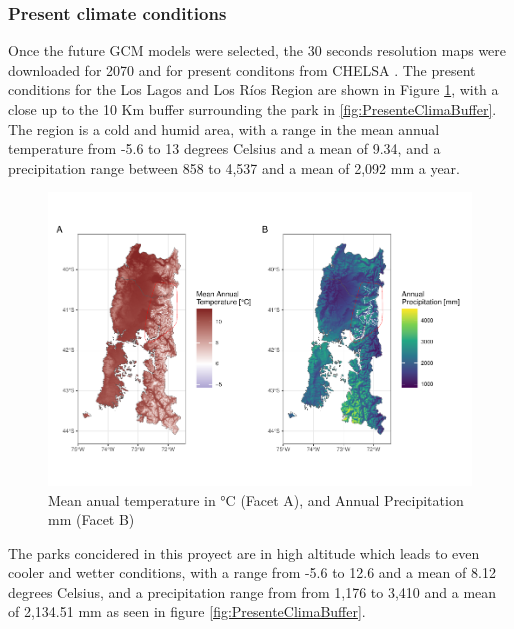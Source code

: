 \documentclass[]{article}
\begin{document}
\hypertarget{present-climate-conditions}{%
\subsubsection{Present climate conditions}\label{present-climate-conditions}}

Once the future GCM models were selected, the 30 seconds resolution maps were downloaded for 2070 and for present conditons from CHELSA \citep{karger2020high}.
The present conditions for the Los Lagos and Los Ríos Region are shown in Figure \ref{fig:PresenteClima}, with a close up to the 10 Km buffer surrounding the park in \ref{fig:PresenteClimaBuffer}. The region is a cold and humid area, with a range in the mean annual temperature from -5.6 to 13 degrees Celsius and a mean of 9.34, and a precipitation range between 858 to 4,537 and a mean of 2,092 mm a year.

\begin{figure}
\includegraphics[width=1\linewidth,height=1\textheight]{Review_and_climate_files/figure-latex/PresenteClima-1} \caption{Mean anual temperature in °C (Facet A), and Annual Precipitation mm (Facet B)}\label{fig:PresenteClima}
\end{figure}

The parks concidered in this proyect are in high altitude which leads to even cooler and wetter conditions, with a range from -5.6 to 12.6 and a mean of 8.12 degrees Celsius, and a precipitation range from from 1,176 to 3,410 and a mean of 2,134.51 mm as seen in figure \ref{fig:PresenteClimaBuffer}.
\end{document}
